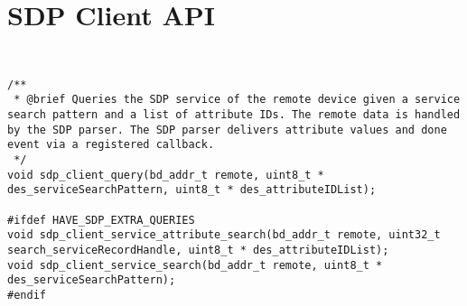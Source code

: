 \section{SDP Client API}
\label{appendix:api_sdp_client}
$ $
\begin{lstlisting}
 
/** 
 * @brief Queries the SDP service of the remote device given a service search pattern and a list of attribute IDs. The remote data is handled by the SDP parser. The SDP parser delivers attribute values and done event via a registered callback.
 */
void sdp_client_query(bd_addr_t remote, uint8_t * des_serviceSearchPattern, uint8_t * des_attributeIDList);

#ifdef HAVE_SDP_EXTRA_QUERIES
void sdp_client_service_attribute_search(bd_addr_t remote, uint32_t search_serviceRecordHandle, uint8_t * des_attributeIDList);
void sdp_client_service_search(bd_addr_t remote, uint8_t * des_serviceSearchPattern);
#endif
\end{lstlisting}
\pagebreak
